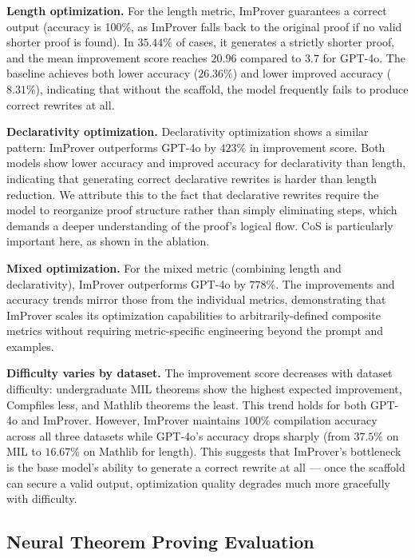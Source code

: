 \textbf{Length optimization.} For the length metric, ImProver guarantees a correct output (accuracy is 100\%, as ImProver falls back to the original proof if no valid shorter proof is found). In $35.44\%$ of cases, it generates a strictly shorter proof, and the mean improvement score reaches $20.96$ compared to $3.7$ for GPT-4o. The baseline achieves both lower accuracy ($26.36\%$) and lower improved accuracy ($8.31\%$), indicating that without the scaffold, the model frequently fails to produce correct rewrites at all.

\textbf{Declarativity optimization.} Declarativity optimization shows a similar pattern: ImProver outperforms GPT-4o by $423\%$ in improvement score. Both models show lower accuracy and improved accuracy for declarativity than length, indicating that generating correct declarative rewrites is harder than length reduction. We attribute this to the fact that declarative rewrites require the model to reorganize proof structure rather than simply eliminating steps, which demands a deeper understanding of the proof's logical flow. CoS is particularly important here, as shown in the ablation.

\textbf{Mixed optimization.} For the mixed metric (combining length and declarativity), ImProver outperforms GPT-4o by $778\%$. The improvements and accuracy trends mirror those from the individual metrics, demonstrating that ImProver scales its optimization capabilities to arbitrarily-defined composite metrics without requiring metric-specific engineering beyond the prompt and examples.

\textbf{Difficulty varies by dataset.} The improvement score decreases with dataset difficulty: undergraduate MIL theorems show the highest expected improvement, Compfiles less, and Mathlib theorems the least. This trend holds for both GPT-4o and ImProver. However, ImProver maintains $100\%$ compilation accuracy across all three datasets while GPT-4o's accuracy drops sharply (from $37.5\%$ on MIL to $16.67\%$ on Mathlib for length). This suggests that ImProver's bottleneck is the base model's ability to generate a correct rewrite at all --- once the scaffold can secure a valid output, optimization quality degrades much more gracefully with difficulty.

\subsection{Neural Theorem Proving Evaluation}

